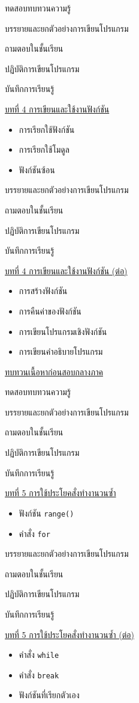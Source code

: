 {
\item ทดสอบทบทวนความรู้
\item  บรรยายและยกตัวอย่างการเขียนโปรแกรม
\item  ถามตอบในชั้นเรียน
\item  ปฏิบัติการเขียนโปรแกรม
\item  บันทึกการเรียนรู้
}
{
\underline{บทที่ 4 การเขียนและใช้งานฟังก์ชัน}
\begin{itemize}
\item การเรียกใช้ฟังก์ชัน
\item การเรียกใช้โมดูล
\item ฟังก์ชันซ้อน
\end{itemize}
}
{
\item  บรรยายและยกตัวอย่างการเขียนโปรแกรม
\item  ถามตอบในชั้นเรียน
\item  ปฏิบัติการเขียนโปรแกรม
\item  บันทึกการเรียนรู้
}
{
\underline{บทที่ 4 การเขียนและใช้งานฟังก์ชัน (ต่อ)}
\begin{itemize}
\item การสร้างฟังก์ชัน
\item การคืนค่าของฟังก์ชัน
\item การเขียนโปรแกรมเชิงฟังก์ชัน
\item การเขียนคำอธิบายโปรแกรม
\end{itemize}
\underline{ทบทวนเนื้อหาก่อนสอบกลางภาค}
}
{
\item ทดสอบทบทวนความรู้
\item  บรรยายและยกตัวอย่างการเขียนโปรแกรม
\item  ถามตอบในชั้นเรียน
\item  ปฏิบัติการเขียนโปรแกรม
\item  บันทึกการเรียนรู้
}
{
\underline{บทที่ 5 การใช้ประโยคสั่งทำงานวนซ้ำ}
\begin{itemize}
\item ฟังก์ชัน \texttt{range()}
\item คำสั่ง \texttt{for}
\end{itemize}

}
{
\item  บรรยายและยกตัวอย่างการเขียนโปรแกรม
\item  ถามตอบในชั้นเรียน
\item  ปฏิบัติการเขียนโปรแกรม
\item  บันทึกการเรียนรู้
}
{
\underline{บทที่ 5 การใช้ประโยคสั่งทำงานวนซ้ำ (ต่อ)}
\begin{itemize}
\item คำสั่ง \texttt{while}
\item คำสั่ง \texttt{break}
\item ฟังก์ชันที่เรียกตัวเอง
\end{itemize}
}
